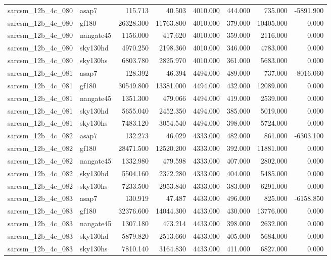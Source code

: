 \begin{tabular}{llrrrrrr}
sarcsm\_12b\_4c\_080 & asap7 & 115.713 & 40.503 & 4010.000 & 444.000 & 735.000 & -5891.900 \\
sarcsm\_12b\_4c\_080 & gf180 & 26328.300 & 11763.800 & 4010.000 & 379.000 & 10405.000 & 0.000 \\
sarcsm\_12b\_4c\_080 & nangate45 & 1156.000 & 417.620 & 4010.000 & 359.000 & 2116.000 & 0.000 \\
sarcsm\_12b\_4c\_080 & sky130hd & 4970.250 & 2198.360 & 4010.000 & 346.000 & 4783.000 & 0.000 \\
sarcsm\_12b\_4c\_080 & sky130hs & 6803.780 & 2825.970 & 4010.000 & 361.000 & 5683.000 & 0.000 \\
sarcsm\_12b\_4c\_081 & asap7 & 128.392 & 46.394 & 4494.000 & 489.000 & 737.000 & -8016.060 \\
sarcsm\_12b\_4c\_081 & gf180 & 30549.800 & 13381.000 & 4494.000 & 432.000 & 12089.000 & 0.000 \\
sarcsm\_12b\_4c\_081 & nangate45 & 1351.300 & 479.066 & 4494.000 & 419.000 & 2539.000 & 0.000 \\
sarcsm\_12b\_4c\_081 & sky130hd & 5655.040 & 2452.350 & 4494.000 & 385.000 & 5019.000 & 0.000 \\
sarcsm\_12b\_4c\_081 & sky130hs & 7483.120 & 3054.540 & 4494.000 & 398.000 & 5724.000 & 0.000 \\
sarcsm\_12b\_4c\_082 & asap7 & 132.273 & 46.029 & 4333.000 & 482.000 & 861.000 & -6303.100 \\
sarcsm\_12b\_4c\_082 & gf180 & 28471.500 & 12520.200 & 4333.000 & 392.000 & 11881.000 & 0.000 \\
sarcsm\_12b\_4c\_082 & nangate45 & 1332.980 & 479.598 & 4333.000 & 407.000 & 2802.000 & 0.000 \\
sarcsm\_12b\_4c\_082 & sky130hd & 5504.160 & 2372.280 & 4333.000 & 404.000 & 5485.000 & 0.000 \\
sarcsm\_12b\_4c\_082 & sky130hs & 7233.500 & 2953.840 & 4333.000 & 383.000 & 6291.000 & 0.000 \\
sarcsm\_12b\_4c\_083 & asap7 & 130.919 & 47.487 & 4433.000 & 496.000 & 825.000 & -6158.850 \\
sarcsm\_12b\_4c\_083 & gf180 & 32376.600 & 14044.300 & 4433.000 & 430.000 & 13776.000 & 0.000 \\
sarcsm\_12b\_4c\_083 & nangate45 & 1307.180 & 473.214 & 4433.000 & 398.000 & 2632.000 & 0.000 \\
sarcsm\_12b\_4c\_083 & sky130hd & 5879.820 & 2513.660 & 4433.000 & 405.000 & 5684.000 & 0.000 \\
sarcsm\_12b\_4c\_083 & sky130hs & 7810.140 & 3164.830 & 4433.000 & 411.000 & 6827.000 & 0.000 \\

\end{tabular}
